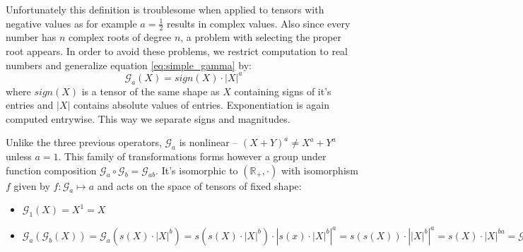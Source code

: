         Unfortunately this definition is troublesome when applied to tensors
        with negative values as for example $a=\frac{1}{2}$ results in
        complex values. Also since every number has $n$ complex roots of degree
        $n$, a problem with selecting the proper root appears. In order to avoid
        these problems, we restrict computation to real numbers and generalize
        equation \ref{eq:simple_gamma} by:
        \newcommand\mcg{\mathcal{G}}
        \begin{equation}
            \mathcal{G}_a(X) = \mathit{sign}(X)\cdot|X|^a
            \label{eq:gamma}
        \end{equation}
        where $\mathit{sign}(X)$ is a tensor of the same shape as $X$ containing
        signs of it's entries and $|X|$ contains absolute values of entries.
        Exponentiation is again computed entrywise. This way we separate signs
        and magnitudes.
        \par Unlike the three previous operators, $\mathcal{G}_a$ is nonlinear --
        $(X+Y)^a \neq X^a + Y^a$ unless $a=1$. This family of transformations forms however a
        group under function composition $\mcg_a \circ \mcg_b = \mcg_{ab}$.
        It's isomorphic to $(\mathbb{R}_+, \cdot)$ with isomorphism $f$
        given by $f:\mcg_a \mapsto a$ and acts on the space of
        tensors of fixed shape:
        \begin{itemize}
            \item $\mathcal{G}_1(X) = X^1 = X$
            \item $\mcg_a\left(\mcg_b\left(X\right)\right) =
                \mcg_a\left(s\left(X\right)\cdot\left|X\right|^b\right) =
                s\left(s\left(X\right)\cdot\left|X\right|^b\right)
                \cdot\left|s\left(x\right)\cdot\left|X\right|^b\right|^a =
                s\left(s\left(X\right)\right)\cdot\left|\left|X\right|^b\right|^a
                = s\left(X\right)\cdot\left|X\right|^{ba} = \mcg_{ab}(X)$
        \end{itemize}



